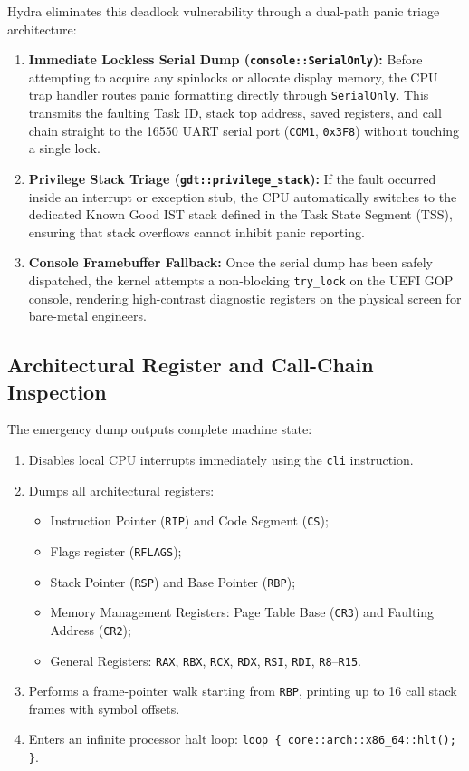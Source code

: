 Hydra eliminates this deadlock vulnerability through a dual-path panic triage architecture:
\begin{enumerate}
    \item \textbf{Immediate Lockless Serial Dump (\texttt{console::SerialOnly}):} Before attempting to acquire any spinlocks or allocate display memory, the CPU trap handler routes panic formatting directly through \texttt{SerialOnly}. This transmits the faulting Task ID, stack top address, saved registers, and call chain straight to the 16550 UART serial port (\texttt{COM1}, \texttt{0x3F8}) without touching a single lock.
    \item \textbf{Privilege Stack Triage (\texttt{gdt::privilege\_stack}):} If the fault occurred inside an interrupt or exception stub, the CPU automatically switches to the dedicated Known Good IST stack defined in the Task State Segment (TSS), ensuring that stack overflows cannot inhibit panic reporting.
    \item \textbf{Console Framebuffer Fallback:} Once the serial dump has been safely dispatched, the kernel attempts a non-blocking \texttt{try\_lock} on the UEFI GOP console, rendering high-contrast diagnostic registers on the physical screen for bare-metal engineers.
\end{enumerate}

\subsection{Architectural Register and Call-Chain Inspection}
The emergency dump outputs complete machine state:
\begin{enumerate}
    \item Disables local CPU interrupts immediately using the \texttt{cli} instruction.
    \item Dumps all architectural registers:
    \begin{itemize}
        \item Instruction Pointer (\texttt{RIP}) and Code Segment (\texttt{CS});
        \item Flags register (\texttt{RFLAGS});
        \item Stack Pointer (\texttt{RSP}) and Base Pointer (\texttt{RBP});
        \item Memory Management Registers: Page Table Base (\texttt{CR3}) and Faulting Address (\texttt{CR2});
        \item General Registers: \texttt{RAX}, \texttt{RBX}, \texttt{RCX}, \texttt{RDX}, \texttt{RSI}, \texttt{RDI}, \texttt{R8}--\texttt{R15}.
    \end{itemize}
    \item Performs a frame-pointer walk starting from \texttt{RBP}, printing up to 16 call stack frames with symbol offsets.
    \item Enters an infinite processor halt loop: \texttt{loop \{ core::arch::x86\_64::hlt(); \}}.
\end{enumerate}
